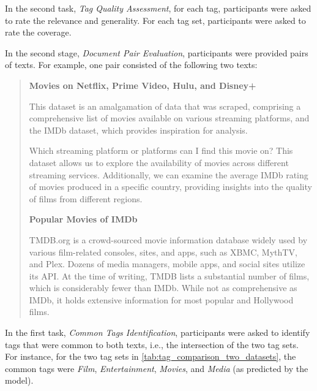 In the second task, \textit{Tag Quality Assessment}, for each tag, participants were asked to rate the relevance and generality. For each tag set, participants were asked to rate the coverage.

In the second stage, \textit{Document Pair Evaluation}, participants were provided pairs of texts. For example, one pair consisted of the following two texts:

\begin{quote}
    \textbf{Movies on Netflix, Prime Video, Hulu, and Disney+}

    This dataset is an amalgamation of data that was scraped, comprising a comprehensive list of movies available on various streaming platforms, and the IMDb dataset, which provides inspiration for analysis.

    Which streaming platform or platforms can I find this movie on? This dataset allows us to explore the availability of movies across different streaming services. Additionally, we can examine the average IMDb rating of movies produced in a specific country, providing insights into the quality of films from different regions.

    \textbf{Popular Movies of IMDb}

    TMDB.org is a crowd-sourced movie information database widely used by various film-related consoles, sites, and apps, such as XBMC, MythTV, and Plex. Dozens of media managers, mobile apps, and social sites utilize its API. At the time of writing, TMDB lists a substantial number of films, which is considerably fewer than IMDb. While not as comprehensive as IMDb, it holds extensive information for most popular and Hollywood films.
\end{quote}

In the first task, \textit{Common Tags Identification}, participants were asked to identify tags that were common to both texts, i.e., the intersection of the two tag sets. For instance, for the two tag sets in \cref{tab:tag_comparison_two_datasets}, the common tags were \textit{Film}, \textit{Entertainment}, \textit{Movies}, and \textit{Media} (as predicted by the model).

